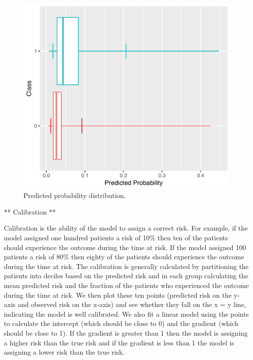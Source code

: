 \documentclass[11pt]{book}
\theoremstyle{definition}
\theoremstyle{definition}
\theoremstyle{definition}
\theoremstyle{remark}
\begin{document}
\begin{figure}

{\centering \includegraphics[width=0.9\linewidth]{images/PatientLevelPrediction/predictionDistribution} 

}

\caption{Predicted probability distribution.}\label{fig:plpPredProb}
\end{figure}

** Calibration **

Calibration is the ability of the model to assign a correct risk. For example, if the model assigned one hundred patients a risk of 10\% then ten of the patients should experience the outcome during the time at risk. If the model assigned 100 patients a risk of 80\% then eighty of the patients should experience the outcome during the time at risk. The calibration is generally calculated by partitioning the patients into deciles based on the predicted risk and in each group calculating the mean predicted risk and the fraction of the patients who experienced the outcome during the time at risk. We then plot these ten points (predicted risk on the y-axis and observed risk on the x-axis) and see whether they fall on the x = y line, indicating the model is well calibrated. We also fit a linear model using the points to calculate the intercept (which should be close to 0) and the gradient (which should be close to 1). If the gradient is greater than 1 then the model is assigning a higher risk than the true risk and if the gradient is less than 1 the model is assigning a lower risk than the true risk.
\end{document}
